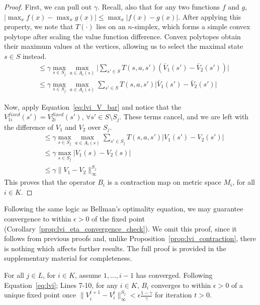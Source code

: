 \begin{proof}
First, we can pull out $\gamma$. Recall, also that for any two functions $f$ and $g$, $| \max_x f(x) - \max_x g(x) | \leq \max_x | f(x) - g(x) |$. After applying this property, we note that $T(\cdot)$ lies on an $n$-simplex, which forms a simple convex polytope after scaling the value function difference. Convex polytopes obtain their maximum values at the vertices, allowing us to select the maximal state $s \in S$ instead.
\begin{align*}
    &\leq \gamma \max_{s \in S_j} \max_{a \in A_i(s)} \Big| \sum_{s' \in S} T(s, a, s') (\bar{V}_1(s') - \bar{V}_2(s')) \Big| \\
    &\leq \gamma \max_{s \in S_j} \max_{a \in A_i(s)} \sum_{s' \in S} T(s, a, s') \Big| \bar{V}_1(s') - \bar{V}_2(s') \Big|
\end{align*}

Now, apply Equation~\ref{eq:lvi_V_bar} and notice that the $V_{1i}^{fixed}(s') = V_{2i}^{fixed}(s')$, $\forall s' \in S \setminus S_j$. These terms cancel, and we are left with the difference of $V_1$ and $V_2$ over $S_j$.
\begin{align*}
    &\leq \gamma \max_{s \in S_j} \max_{a \in A_i(s)} \sum_{s' \in S_j} T(s, a, s') \Big| V_1(s') - V_2(s') \Big| \\
    &\leq \gamma \max_{s \in S_j} \Big| V_1(s) - V_2(s) \Big| \\
    &\leq \gamma \| V_1 - V_2 \|_\infty^{S_j}
\end{align*}
This proves that the operator $B_i$ is a contraction map on metric space $M_i$, for all $i \in K$.
\end{proof}

Following the same logic as Bellman's optimality equation, we may guarantee convergence to within $\epsilon > 0$ of the fixed point (Corollary~\ref{prop:lvi_eta_convergence_check}). We omit this proof, since it follows from previous proofs and, unlike Proposition~\ref{prop:lvi_contraction}, there is nothing which affects further results. The full proof is provided in the supplementary material for completeness.

\begin{proposition}
    \label{prop:lvi_eta_convergence_check}
    For all $j \in L$, for $i \in K$, assume $1, \ldots, i - 1$ has converged. Following Equation~\ref{eq:lvi}; Lines 7-10, for any $i \in K$, $B_i$ converges to within $\epsilon > 0$ of a unique fixed point once $\| V_i^{t+1} - V_i^t \|_\infty^{S_j} < \epsilon \frac{1 - \gamma}{\gamma}$ for iteration $t > 0$.
\end{proposition}

